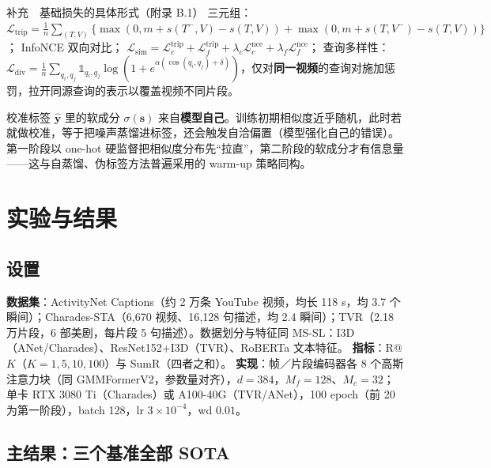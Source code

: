 \documentclass[11pt,a4paper,UTF8,fontset=windows]{ctexart}
\newcommand{\term}[1]{\textbf{#1}}
\newcommand{\vect}[1]{\boldsymbol{#1}}
\begin{document}
\begin{greybox}{补充　基础损失的具体形式（附录 B.1）}
三元组：$\mathcal{L}_{\mathrm{trip}}=\frac1n\sum_{(T,V)}\{\max(0,m+s(T^-,V)-s(T,V))+\max(0,m+s(T,V^-)-s(T,V))\}$；
InfoNCE 双向对比；
$\mathcal{L}_{\mathrm{sim}}=\mathcal{L}^{\mathrm{trip}}_c+\mathcal{L}^{\mathrm{trip}}_f+\lambda_c\mathcal{L}^{\mathrm{nce}}_c+\lambda_f\mathcal{L}^{\mathrm{nce}}_f$；
查询多样性：$\mathcal{L}_{\mathrm{div}}=\frac1n\sum_{q_i,q_j}\mathbb 1_{q_i,q_j}\log(1+e^{\alpha(\cos(q_i,q_j)+\delta)})$，仅对\term{同一视频}的查询对施加惩罚，拉开同源查询的表示以覆盖视频不同片段。
\end{greybox}

\begin{thinkbox}[为什么标签校准必须等一等？]
校准标签 $\hat{\vect y}$ 里的软成分 $\sigma(\vect s)$ 来自\term{模型自己}。训练初期相似度近乎随机，此时若就做校准，等于把噪声蒸馏进标签，还会触发自洽偏置（模型强化自己的错误）。第一阶段以 one-hot 硬监督把相似度分布先“拉直”，第二阶段的软成分才有信息量——这与自蒸馏、伪标签方法普遍采用的 warm-up 策略同构。
\end{thinkbox}

\section{实验与结果}

\subsection{设置}

\textbf{数据集}：ActivityNet Captions（约 2 万条 YouTube 视频，均长 118 s，均 3.7 个瞬间）；Charades-STA（6{,}670 视频、16{,}128 句描述，均 2.4 瞬间）；TVR（2.18 万片段，6 部美剧，每片段 5 句描述）。数据划分与特征同 MS-SL：I3D（ANet/Charades）、ResNet152+I3D（TVR）、RoBERTa 文本特征。
\textbf{指标}：R@$K$（$K=1,5,10,100$）与 SumR（四者之和）。
\textbf{实现}：帧／片段编码器各 8 个高斯注意力块（同 GMMFormerV2，参数量对齐），$d=384$，$M_f=128$、$M_c=32$；单卡 RTX 3080 Ti（Charades）或 A100-40G（TVR/ANet），100 epoch（前 20 为第一阶段），batch 128，lr $3\times10^{-4}$，wd $0.01$。

\subsection{主结果：三个基准全部 SOTA}
\end{document}
